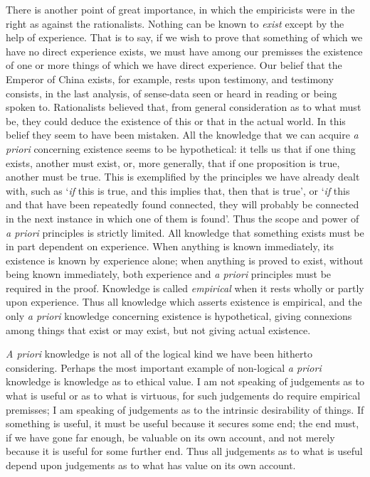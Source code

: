 \documentclass[oneside,letterpaper,12pt]{book}
\begin{document}
There is another point of great importance, in which the empiricists
were in the right as against the rationalists. \label{exist} Nothing can be known to
\emph{exist} except by the help of experience. That is to say, if we
wish to prove that something of which we have no direct experience
exists, we must have among our premisses the existence of one or more
things of which we have direct experience. Our belief that the Emperor
of China\label{China2} exists, for example, rests upon testimony, and testimony
consists, in the last analysis, of sense-data seen or heard in reading
or being spoken to. Rationalists believed that, from general
consideration as to what must be, they could deduce the existence of
this or that in the actual world. In this belief they seem to have been
mistaken. All the knowledge that we can acquire \emph{a priori}
concerning existence seems to be hypothetical: it tells us that if one
thing exists, another must exist, or, more generally, that if one
proposition is true, another must be true. This is exemplified by the
principles we have already dealt with, such as
`\emph{if} this is true, and this implies that, then
that is true', or `\emph{if} this and
that have been repeatedly found connected, they will probably be
connected in the next instance in which one of them is
found'. Thus the scope and power of \emph{a priori}
principles is strictly limited. All knowledge that something exists must
be in part dependent on experience. When anything is known immediately,
its existence is known by experience alone; when anything is proved to
exist, without being known immediately, both experience and \emph{a
priori} principles must be required in the proof. Knowledge is called
\emph{empirical} when it rests wholly or partly upon experience. Thus
all knowledge which asserts existence is empirical, and the only \emph{a
priori} knowledge concerning existence is hypothetical, giving
connexions among things that exist or may exist, but not giving actual
existence.

\emph{A priori} knowledge is not all of the logical kind we have been
hitherto considering. Perhaps the most important example of non-logical
\emph{a priori} knowledge is knowledge as to ethical value. I am not
speaking of judgements as to what is useful or as to what is virtuous,
for such judgements do require empirical premisses; I am speaking of
judgements as to the intrinsic desirability of things. If something is
useful, it must be useful because it secures some end; the end must, if
we have gone far enough, be valuable on its own account, and not merely
because it is useful for some further end. Thus all judgements as to
what is useful depend upon judgements as to what has value on its own
account.
\end{document}
